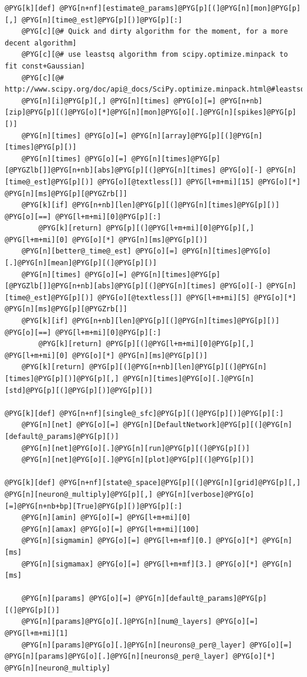 \documentclass[letterpaper,10pt,english]{manual}
\begin{document}
\begin{Verbatim}[commandchars=@\[\]]
@PYG[k][def] @PYG[n+nf][estimate@_params]@PYG[p][(]@PYG[n][mon]@PYG[p][,] @PYG[n][time@_est]@PYG[p][)]@PYG[p][:]
    @PYG[c][@# Quick and dirty algorithm for the moment, for a more decent algorithm]
    @PYG[c][@# use leastsq algorithm from scipy.optimize.minpack to fit const+Gaussian]
    @PYG[c][@# http://www.scipy.org/doc/api@_docs/SciPy.optimize.minpack.html@#leastsq]
    @PYG[n][i]@PYG[p][,] @PYG[n][times] @PYG[o][=] @PYG[n+nb][zip]@PYG[p][(]@PYG[o][*]@PYG[n][mon]@PYG[o][.]@PYG[n][spikes]@PYG[p][)]
    @PYG[n][times] @PYG[o][=] @PYG[n][array]@PYG[p][(]@PYG[n][times]@PYG[p][)]
    @PYG[n][times] @PYG[o][=] @PYG[n][times]@PYG[p][@PYGZlb[]]@PYG[n+nb][abs]@PYG[p][(]@PYG[n][times] @PYG[o][-] @PYG[n][time@_est]@PYG[p][)] @PYG[o][@textless[]] @PYG[l+m+mi][15] @PYG[o][*] @PYG[n][ms]@PYG[p][@PYGZrb[]]
    @PYG[k][if] @PYG[n+nb][len]@PYG[p][(]@PYG[n][times]@PYG[p][)] @PYG[o][==] @PYG[l+m+mi][0]@PYG[p][:]
        @PYG[k][return] @PYG[p][(]@PYG[l+m+mi][0]@PYG[p][,] @PYG[l+m+mi][0] @PYG[o][*] @PYG[n][ms]@PYG[p][)]
    @PYG[n][better@_time@_est] @PYG[o][=] @PYG[n][times]@PYG[o][.]@PYG[n][mean]@PYG[p][(]@PYG[p][)]
    @PYG[n][times] @PYG[o][=] @PYG[n][times]@PYG[p][@PYGZlb[]]@PYG[n+nb][abs]@PYG[p][(]@PYG[n][times] @PYG[o][-] @PYG[n][time@_est]@PYG[p][)] @PYG[o][@textless[]] @PYG[l+m+mi][5] @PYG[o][*] @PYG[n][ms]@PYG[p][@PYGZrb[]]
    @PYG[k][if] @PYG[n+nb][len]@PYG[p][(]@PYG[n][times]@PYG[p][)] @PYG[o][==] @PYG[l+m+mi][0]@PYG[p][:]
        @PYG[k][return] @PYG[p][(]@PYG[l+m+mi][0]@PYG[p][,] @PYG[l+m+mi][0] @PYG[o][*] @PYG[n][ms]@PYG[p][)]
    @PYG[k][return] @PYG[p][(]@PYG[n+nb][len]@PYG[p][(]@PYG[n][times]@PYG[p][)]@PYG[p][,] @PYG[n][times]@PYG[o][.]@PYG[n][std]@PYG[p][(]@PYG[p][)]@PYG[p][)]

@PYG[k][def] @PYG[n+nf][single@_sfc]@PYG[p][(]@PYG[p][)]@PYG[p][:]
    @PYG[n][net] @PYG[o][=] @PYG[n][DefaultNetwork]@PYG[p][(]@PYG[n][default@_params]@PYG[p][)]
    @PYG[n][net]@PYG[o][.]@PYG[n][run]@PYG[p][(]@PYG[p][)]
    @PYG[n][net]@PYG[o][.]@PYG[n][plot]@PYG[p][(]@PYG[p][)]

@PYG[k][def] @PYG[n+nf][state@_space]@PYG[p][(]@PYG[n][grid]@PYG[p][,] @PYG[n][neuron@_multiply]@PYG[p][,] @PYG[n][verbose]@PYG[o][=]@PYG[n+nb+bp][True]@PYG[p][)]@PYG[p][:]
    @PYG[n][amin] @PYG[o][=] @PYG[l+m+mi][0]
    @PYG[n][amax] @PYG[o][=] @PYG[l+m+mi][100]
    @PYG[n][sigmamin] @PYG[o][=] @PYG[l+m+mf][0.] @PYG[o][*] @PYG[n][ms]
    @PYG[n][sigmamax] @PYG[o][=] @PYG[l+m+mf][3.] @PYG[o][*] @PYG[n][ms]

    @PYG[n][params] @PYG[o][=] @PYG[n][default@_params]@PYG[p][(]@PYG[p][)]
    @PYG[n][params]@PYG[o][.]@PYG[n][num@_layers] @PYG[o][=] @PYG[l+m+mi][1]
    @PYG[n][params]@PYG[o][.]@PYG[n][neurons@_per@_layer] @PYG[o][=] @PYG[n][params]@PYG[o][.]@PYG[n][neurons@_per@_layer] @PYG[o][*] @PYG[n][neuron@_multiply]


\end{Verbatim}
\end{document}
